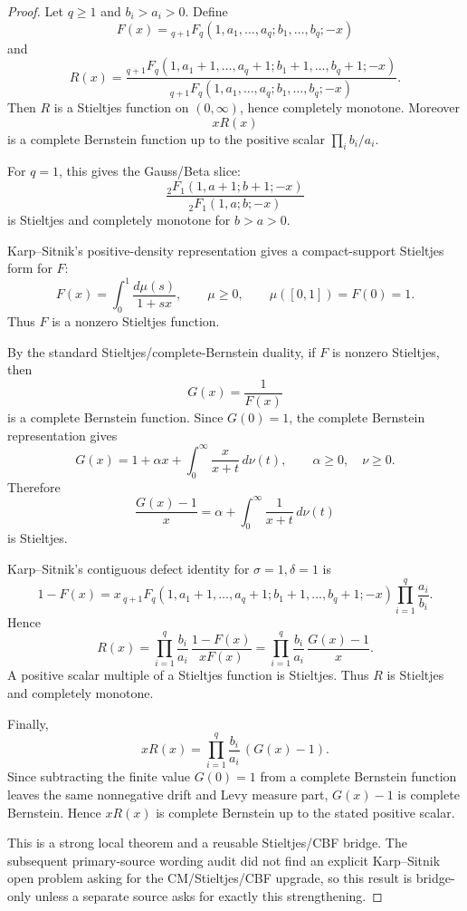 \begin{proof}
Let \(q\ge1\) and \(b_i>a_i>0\). Define
\[
F(x)={}_{q+1}F_q(1,a_1,\ldots,a_q;b_1,\ldots,b_q;-x)
\]
and
\[
R(x)=
\frac{{}_{q+1}F_q(1,a_1+1,\ldots,a_q+1;b_1+1,\ldots,b_q+1;-x)}
{{}_{q+1}F_q(1,a_1,\ldots,a_q;b_1,\ldots,b_q;-x)}.
\]
Then \(R\) is a Stieltjes function on \((0,\infty)\), hence completely monotone. Moreover
\[
xR(x)
\]
is a complete Bernstein function up to the positive scalar \(\prod_i b_i/a_i\).

For \(q=1\), this gives the Gauss/Beta slice:
\[
\frac{{}_2F_1(1,a+1;b+1;-x)}{{}_2F_1(1,a;b;-x)}
\]
is Stieltjes and completely monotone for \(b>a>0\).

Karp--Sitnik's positive-density representation gives a compact-support Stieltjes form for \(F\):
\[
F(x)=\int_0^1 \frac{d\mu(s)}{1+sx},
\qquad \mu\ge0,
\qquad \mu([0,1])=F(0)=1.
\]
Thus \(F\) is a nonzero Stieltjes function.

By the standard Stieltjes/complete-Bernstein duality, if \(F\) is nonzero Stieltjes, then
\[
G(x)=\frac1{F(x)}
\]
is a complete Bernstein function. Since \(G(0)=1\), the complete Bernstein representation gives
\[
G(x)=1+\alpha x+\int_0^\infty \frac{x}{x+t}\,d\nu(t),
\qquad \alpha\ge0,\quad \nu\ge0.
\]
Therefore
\[
\frac{G(x)-1}{x}
=\alpha+\int_0^\infty \frac{1}{x+t}\,d\nu(t)
\]
is Stieltjes.

Karp--Sitnik's contiguous defect identity for \(\sigma=1,\delta=1\) is
\[
1-F(x)
=x\,{}_{q+1}F_q(1,a_1+1,\ldots,a_q+1;b_1+1,\ldots,b_q+1;-x)
\prod_{i=1}^q\frac{a_i}{b_i}.
\]
Hence
\[
R(x)=
\prod_{i=1}^q\frac{b_i}{a_i}\,
\frac{1-F(x)}{xF(x)}
=
\prod_{i=1}^q\frac{b_i}{a_i}\,
\frac{G(x)-1}{x}.
\]
A positive scalar multiple of a Stieltjes function is Stieltjes. Thus \(R\) is Stieltjes and completely monotone.

Finally,
\[
xR(x)=\prod_{i=1}^q\frac{b_i}{a_i}\,(G(x)-1).
\]
Since subtracting the finite value \(G(0)=1\) from a complete Bernstein function leaves the same nonnegative drift and Levy measure part, \(G(x)-1\) is complete Bernstein. Hence \(xR(x)\) is complete Bernstein up to the stated positive scalar.

This is a strong local theorem and a reusable Stieltjes/CBF bridge. The subsequent primary-source wording audit did not find an explicit Karp--Sitnik open problem asking for the CM/Stieltjes/CBF upgrade, so this result is bridge-only unless a separate source asks for exactly this strengthening.
\end{proof}

